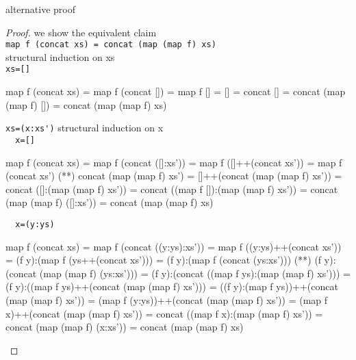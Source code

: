 \newpage
alternative proof
\begin{proof} we show the equivalent claim \\
\verb|map f (concat xs) = concat (map (map f) xs)|\\
structural induction on xs\\
\verb|xs=[]|
\begin{code}
map f (concat xs) = map f (concat [])
                  = map f []
                  = []
                  = concat []
                  = concat (map (map f) [])
                  = concat (map (map f) xs)
\end{code}
\verb|xs=(x:xs')|
structural induction on x\\
\verb|  x=[]|
\begin{code}
map f (concat xs) = map f (concat ([]:xs'))
                  = map f ([]++(concat xs'))
                  = map f (concat xs')
                  (**) concat (map (map f) xs')
                  = []++(concat (map (map f) xs'))
                  = concat ([]:(map (map f) xs'))
                  = concat ((map f []):(map (map f) xs'))
                  = concat (map (map f) ([]:xs'))
                  = concat (map (map f) xs)
\end{code}
\verb|  x=(y:ys)|
\begin{code}
map f (concat xs) = map f (concat ((y:ys):xs'))
                  = map f ((y:ys)++(concat xs'))
                  = (f y):(map f (ys++(concat xs')))
                  = (f y):(map f (concat (ys:xs')))
                  (**) (f y):(concat (map (map f) (ys:xs')))
                  = (f y):(concat ((map f ys):(map (map f) xs')))
                  = (f y):((map f ys)++(concat (map (map f) xs')))
                  = ((f y):(map f ys))++(concat (map (map f) xs'))
                  = (map f (y:ys))++(concat (map (map f) xs'))
                  = (map f x)++(concat (map (map f) xs'))
                  = concat ((map f x):(map (map f) xs'))
                  = concat (map (map f) (x:xs'))
                  = concat (map (map f) xs)
\end{code}
\end{proof}